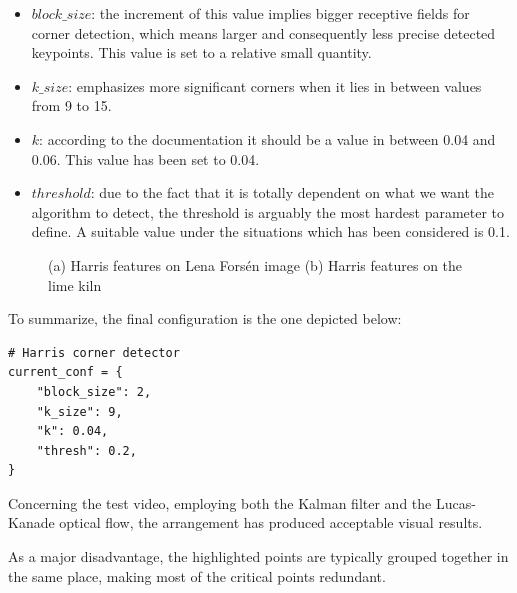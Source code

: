 \documentclass[journal]{IEEEtran}
\begin{document}
\begin{itemize}
    \item $block\_size$: the increment of this value implies bigger receptive fields for corner detection, which means larger and consequently less precise detected keypoints. This value is set to a relative small quantity.
    \item $k\_size$: emphasizes more significant corners when it lies in between values from 9 to 15.
    \item $k$: according to the documentation it should be a value in between 0.04 and 0.06. This value has been set to 0.04.
    \item $threshold$: due to the fact that it is totally dependent on what we want the algorithm to detect, the threshold is arguably the most hardest parameter to define. A suitable value under the situations which has been considered is 0.1.
\end{itemize}

\begin{figure}
\centering
    \caption{(a) Harris features on Lena Forsén image (b) Harris features on the lime kiln}
    \label{fig:harris}
\end{figure}

To summarize, the final configuration is the one depicted below:

\begin{verbatim}
# Harris corner detector
current_conf = {
    "block_size": 2,
    "k_size": 9,
    "k": 0.04,
    "thresh": 0.2,
}
\end{verbatim}

Concerning the test video, employing both the Kalman filter and the Lucas-Kanade optical flow, the arrangement has produced acceptable visual results.

As a major disadvantage, the highlighted points are typically grouped together in the same place, making most of the critical points redundant.
\end{document}
